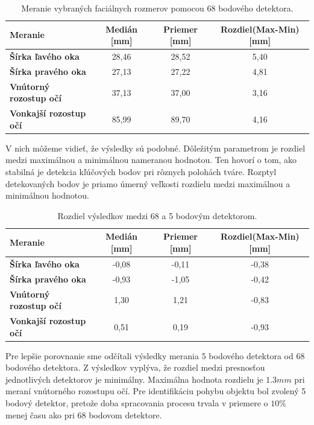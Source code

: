 \begin{table}[h]
	\caption{\label{tab:dlib:68points} Meranie vybraných faciálnych rozmerov pomocou 68 bodového detektora.}
	\centering
	\begin{tabular}{lccc}
		\toprule
		\textbf{Meranie} & \textbf{Medián [mm]} & \textbf{Priemer [mm]} & \textbf{Rozdiel(Max-Min) [mm]} \\ 
		\midrule
		\textbf{Šírka ľavého oka} 	& 28,46 & 28,52	& 5,40 \\
		\textbf{Šírka pravého oka} 	& 27,13	& 27,22 & 4,81 \\
		\textbf{Vnútorný rozostup očí} 	& 37,13	& 37,00 & 3,16 \\
		\textbf{Vonkajší rozostup očí} 	& 85,99	& 89,70 & 4,16 \\
		\bottomrule
	\end{tabular}
\end{table}

V nich môžeme vidieť, že výsledky sú podobné. Dôležitým parametrom je rozdiel medzi maximálnou a minimálnou nameranou hodnotou. Ten hovorí o tom, ako stabilná je detekcia kľúčových bodov pri rôznych polohách tváre. Rozptyl detekovaných bodov je priamo úmerný veľkosti rozdielu medzi maximálnou a minimálnou hodnotou.

\begin{table}[H]
	\caption{\label{tab:dlib:resulrs} Rozdiel výsledkov medzi 68 a 5 bodovým detektorom.}
	\centering
	\begin{tabular}{lccc}
		\toprule
		\textbf{Meranie} & \textbf{Medián [mm]} & \textbf{Priemer [mm]} & \textbf{Rozdiel(Max-Min) [mm]} \\ 
		\midrule
		\textbf{Šírka ľavého oka} 	& -0,08 & -0,11	& -0,38 \\
		\textbf{Šírka pravého oka} 	& -0,93	& -1,05 & -0,42 \\
		\textbf{Vnútorný rozostup očí} 	& 1,30	& 1,21 & -0,83 \\
		\textbf{Vonkajší rozostup očí} 	& 0,51	& 0,19 & -0,93 \\
		\bottomrule
	\end{tabular}
\end{table}

Pre lepšie porovnanie sme odčítali výsledky merania 5 bodového detektora od 68 bodového detektora. Z výsledkov vyplýva, že rozdiel medzi presnosťou jednotlivých detektorov je minimálny. Maximálna hodnota rozdielu je $1.3mm$ pri meraní vnútorného rozostupu očí.
Pre identifikáciu pohybu objektu bol zvolený 5 bodový detektor, pretože doba spracovania procesu trvala v priemere o $ 10\% $ menej času ako pri 68 bodovom detektore.  

